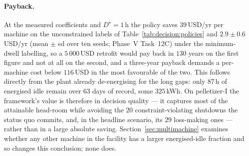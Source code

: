 \paragraph{Payback.}
At the measured coefficients and $D^{\star}=1$\,h the policy saves
$39$\,USD/yr per machine on the unconstrained labels of
Table~\ref{tab:decision:policies} and $2.9 \pm 0.6$\,USD/yr
(mean $\pm$ sd over ten seeds; Phase~V Task~12C) under the
minimum-dwell labelling, so a $5\,000$\,USD retrofit would pay back in
$130$ years on the first figure and not at all on the second, and a
three-year payback demands a per-machine cost below $116$\,USD in the
most favourable of the two. This follows directly from the plant already de-energising
for the long gaps: only $87$\,h of energised idle remain over $63$ days
of record, some $325$\,kWh. On pelletizer-I the framework's value is
therefore in decision quality --- it captures most of the attainable
head-room while avoiding the $20$ constraint-violating shutdowns the
status quo commits, and, in the headline scenario, its $29$ loss-making
ones --- rather than in a
large absolute saving. Section~\ref{sec:multimachine} examines whether
any other machine in the facility has a larger energised-idle fraction
and so changes this conclusion; none does.
